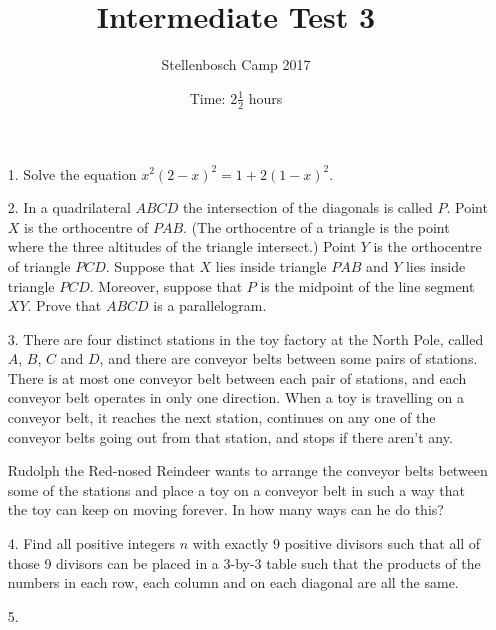 \documentclass[12pt]{article}
\title{Intermediate Test 3}
\author{Stellenbosch Camp 2017}
\date{Time: $2\frac{1}{2}$ hours}
\begin{document}
 \maketitle

\begin{enumerate}

\item[1.]  %
Solve the equation $x^2(2-x)^2 = 1 + 2(1-x)^2$.


\item[2.] %
In a quadrilateral $ABCD$ the intersection of the diagonals is called $P$. Point $X$ is the orthocentre of $PAB$. (The orthocentre of a triangle is the point where the three altitudes of the triangle intersect.) Point $Y$ is the orthocentre of triangle $PCD$. Suppose that $X$ lies inside triangle $PAB$ and $Y$ lies inside triangle $PCD$. Moreover, suppose that $P$ is the midpoint of the line segment $XY$. Prove that $ABCD$ is a parallelogram.


\item[3.] %
There are four distinct stations in the toy factory at the North Pole, called $A$, $B$, $C$ and $D$, and there are conveyor belts between some pairs of stations. There is at most one conveyor belt between each pair of stations, and each conveyor belt operates in only one direction. When a toy is travelling on a conveyor belt, it reaches the next station, continues on any one of the conveyor belts going out from that station, and stops if there aren't any.

Rudolph the Red-nosed Reindeer wants to arrange the conveyor belts between some of the stations and place a toy on a conveyor belt in such a way that the toy can keep on moving forever. In how many ways can he do this?


\item[4.] %
Find all positive integers $n$ with exactly 9 positive divisors such that all of those 9 divisors can be placed in a 3-by-3 table such that the products of the numbers in each row, each column and on each diagonal are all the same.


\item[5.] %


\end{enumerate}
\end{document}
